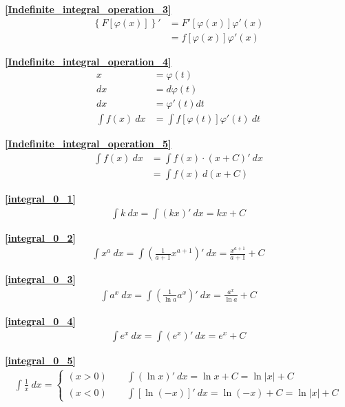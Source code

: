 \textbf{\large \ref{Indefinite_integral_operation_3}}
\begin{align*}
    \left\{F\left[\varphi(x)\right]\right\}'&=F'\left[\varphi (x)\right]\varphi'(x)\\
    &=f\left[\varphi(x)\right]\varphi'(x)
\end{align*}

\textbf{\large \ref{Indefinite_integral_operation_4}}
\begin{align*}
    x&=\varphi(t)\\
    dx&=d\varphi(t)\\
    dx&=\varphi'(t)dt\\
    \int f(x)\ dx&=\int f\left[\varphi(t)\right]\varphi'(t) \ dt
\end{align*}

\textbf{\large \ref{Indefinite_integral_operation_5}}
\begin{align*}
    \int f(x)\ dx&=\int f(x)\cdot(x+C)'\ dx\\
    &=\int f(x)\ d(x+C)
\end{align*}

\textbf{\large \ref{integral_0_1}}
\begin{align*}
        \int k\ dx=\int (kx)'\ dx=kx+C
\end{align*}

\textbf{\large \ref{integral_0_2}}
\begin{align*}
        \int x^a\ dx=\int \left(\frac{1}{a+1}x^{a+1}\right)'\ dx=\frac{x^{a+1}}{a+1}+C
\end{align*}

\textbf{\large \ref{integral_0_3}}
\begin{align*}
        \int a^x\ dx=\int \left(\frac{1}{\ln a}a^x\right)'\ dx=\frac{a^x}{\ln a}+C
\end{align*}

\textbf{\large \ref{integral_0_4}}
\begin{align*}
        \int e^x\ dx=\int (e^x)'\ dx=e^x+C
\end{align*}

\textbf{\large \ref{integral_0_5}}
\begin{align*}
        \int \frac{1}{x}\ dx=\begin{cases}
                (x>0)\qquad\int (\ln x)'\ dx=\ln x+C=\ln \left|x\right|+C\\
                (x<0)\qquad\int \left[\ln (-x)\right]'\ dx=\ln(-x)+C=\ln \left|x\right|+C
        \end{cases}
\end{align*}

